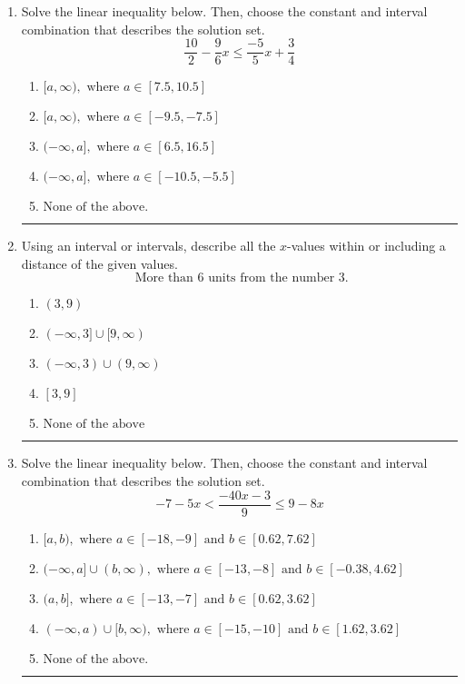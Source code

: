 \documentclass[14pt]{extbook}
\newcommand{\litem}[1]{\item#1\hspace*{-1cm}\rule{\textwidth}{0.4pt}}
\begin{document}
\begin{enumerate}
{\begin{enumerate}[label=\Alph*.]
\end{enumerate} }
\litem{
Solve the linear inequality below. Then, choose the constant and interval combination that describes the solution set.\[ \frac{10}{2} - \frac{9}{6} x \leq \frac{-5}{5} x + \frac{3}{4} \]\begin{enumerate}[label=\Alph*.]
\item \( [a, \infty), \text{ where } a \in [7.5, 10.5] \)
\item \( [a, \infty), \text{ where } a \in [-9.5, -7.5] \)
\item \( (-\infty, a], \text{ where } a \in [6.5, 16.5] \)
\item \( (-\infty, a], \text{ where } a \in [-10.5, -5.5] \)
\item \( \text{None of the above}. \)

\end{enumerate} }
\litem{
Using an interval or intervals, describe all the $x$-values within or including a distance of the given values.\[ \text{ More than } 6 \text{ units from the number } 3. \]\begin{enumerate}[label=\Alph*.]
\item \( (3, 9) \)
\item \( (-\infty, 3] \cup [9, \infty) \)
\item \( (-\infty, 3) \cup (9, \infty) \)
\item \( [3, 9] \)
\item \( \text{None of the above} \)

\end{enumerate} }
\litem{
Solve the linear inequality below. Then, choose the constant and interval combination that describes the solution set.\[ -7 - 5 x < \frac{-40 x - 3}{9} \leq 9 - 8 x \]\begin{enumerate}[label=\Alph*.]
\item \( [a, b), \text{ where } a \in [-18, -9] \text{ and } b \in [0.62, 7.62] \)
\item \( (-\infty, a] \cup (b, \infty), \text{ where } a \in [-13, -8] \text{ and } b \in [-0.38, 4.62] \)
\item \( (a, b], \text{ where } a \in [-13, -7] \text{ and } b \in [0.62, 3.62] \)
\item \( (-\infty, a) \cup [b, \infty), \text{ where } a \in [-15, -10] \text{ and } b \in [1.62, 3.62] \)
\item \( \text{None of the above.} \)


\end{enumerate}}
\end{enumerate}
\end{document}
